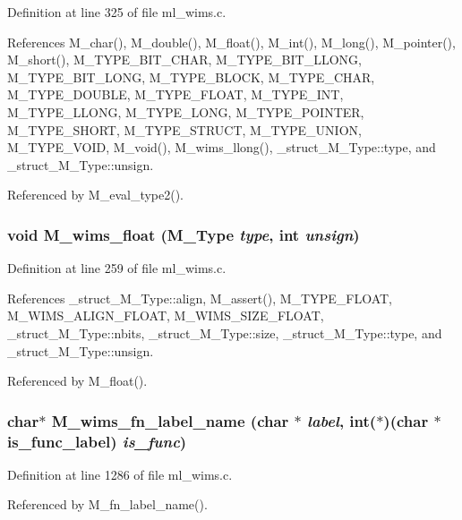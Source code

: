 Definition at line 325 of file ml\_\-wims.c.

References M\_\-char(), M\_\-double(), M\_\-float(), M\_\-int(), M\_\-long(), M\_\-pointer(), M\_\-short(), M\_\-TYPE\_\-BIT\_\-CHAR, M\_\-TYPE\_\-BIT\_\-LLONG, M\_\-TYPE\_\-BIT\_\-LONG, M\_\-TYPE\_\-BLOCK, M\_\-TYPE\_\-CHAR, M\_\-TYPE\_\-DOUBLE, M\_\-TYPE\_\-FLOAT, M\_\-TYPE\_\-INT, M\_\-TYPE\_\-LLONG, M\_\-TYPE\_\-LONG, M\_\-TYPE\_\-POINTER, M\_\-TYPE\_\-SHORT, M\_\-TYPE\_\-STRUCT, M\_\-TYPE\_\-UNION, M\_\-TYPE\_\-VOID, M\_\-void(), M\_\-wims\_\-llong(), \_\-struct\_\-M\_\-Type::type, and \_\-struct\_\-M\_\-Type::unsign.

Referenced by M\_\-eval\_\-type2().
\subsubsection{\setlength{\rightskip}{0pt plus 5cm}void M\_\-wims\_\-float (\bf{M\_\-Type} {\em type}, int {\em unsign})}\label{m__wims_8h_47e5494bf5c6d5f4fb8a6d0db5852037}




Definition at line 259 of file ml\_\-wims.c.

References \_\-struct\_\-M\_\-Type::align, M\_\-assert(), M\_\-TYPE\_\-FLOAT, M\_\-WIMS\_\-ALIGN\_\-FLOAT, M\_\-WIMS\_\-SIZE\_\-FLOAT, \_\-struct\_\-M\_\-Type::nbits, \_\-struct\_\-M\_\-Type::size, \_\-struct\_\-M\_\-Type::type, and \_\-struct\_\-M\_\-Type::unsign.

Referenced by M\_\-float().
\subsubsection{\setlength{\rightskip}{0pt plus 5cm}char$\ast$ M\_\-wims\_\-fn\_\-label\_\-name (char $\ast$ {\em label}, int($\ast$)(char $\ast$is\_\-func\_\-label) {\em is\_\-func})}\label{m__wims_8h_8ee362ae84a6f9434982b4e1c837ce73}




Definition at line 1286 of file ml\_\-wims.c.

Referenced by M\_\-fn\_\-label\_\-name().
